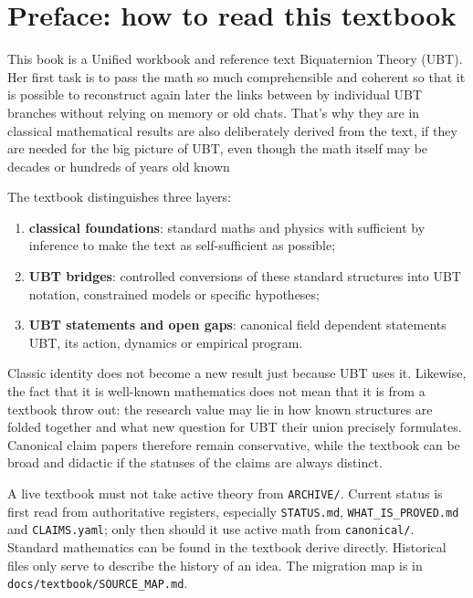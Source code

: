 
\chapter*{Preface: how to read this textbook}

This book is a Unified workbook and reference text
Biquaternion Theory (UBT). Her first task is to pass the math so much
comprehensible and coherent so that it is possible to reconstruct again later the links between
by individual UBT branches without relying on memory or old chats. That's why they are in
classical mathematical results are also deliberately derived from the text, if they are needed
for the big picture of UBT, even though the math itself may be decades or hundreds of years old
known

The textbook distinguishes three layers:
\begin{enumerate}
  \item\textbf{classical foundations}: standard maths and physics with sufficient
        by inference to make the text as self-sufficient as possible;
  \item\textbf{UBT bridges}: controlled conversions of these standard structures
        into UBT notation, constrained models or specific hypotheses;
  \item\textbf{UBT statements and open gaps}: canonical field dependent statements
        UBT, its action, dynamics or empirical program.
\end{enumerate}

Classic identity does not become a new result just because UBT uses it.
Likewise, the fact that it is well-known mathematics does not mean that it is from a textbook
throw out: the research value may lie in how known structures are folded
together and what new question for UBT their union precisely formulates.
Canonical claim papers therefore remain conservative, while the textbook can
be broad and didactic if the statuses of the claims are always distinct.

A live textbook must not take active theory from \texttt{ARCHIVE/}. Current
status is first read from authoritative registers, especially \texttt{STATUS.md},
\texttt{WHAT\_IS\_PROVED.md} and \texttt{CLAIMS.yaml}; only then should it use
active math from \texttt{canonical/}. Standard mathematics can be found in the textbook
derive directly. Historical files only serve to describe the history of an idea.
The migration map is in \texttt{docs/textbook/SOURCE\_MAP.md}.

